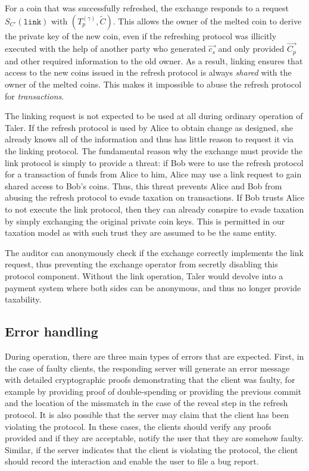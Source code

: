 \documentclass{llncs}
\begin{document}
For a coin that was successfully refreshed, the exchange responds to a
request $S_{C'}(\mathtt{link})$ with $(T^{(\gamma)}_p, \widetilde{C})$.
%
This allows the owner of the melted coin to derive the private key of
the new coin, even if the refreshing protocol was illicitly executed
with the help of another party who generated $\vec{c_s}$ and only
provided $\vec{C_p}$ and other required information to the old owner.
As a result, linking ensures that access to the new coins issued in
the refresh protocol is always {\em shared} with the owner of the
melted coins.  This makes it impossible to abuse the refresh protocol
for {\em transactions}.

The linking request is not expected to be used at all during ordinary
operation of Taler.  If the refresh protocol is used by Alice to
obtain change as designed, she already knows all of the information
and thus has little reason to request it via the linking protocol.
The fundamental reason why the exchange must provide the link protocol
is simply to provide a threat: if Bob were to use the refresh protocol
for a transaction of funds from Alice to him, Alice may use a link
request to gain shared access to Bob's coins. Thus, this threat
prevents Alice and Bob from abusing the refresh protocol to evade
taxation on transactions. If Bob trusts Alice to not execute the link
protocol, then they can already conspire to evade taxation by simply
exchanging the original private coin keys.  This is permitted in our
taxation model as with such trust they are assumed to be the same
entity.

The auditor can anonymously check if the exchange correctly implements the
link request, thus preventing the exchange operator from secretly disabling
this protocol component.  Without the link operation, Taler would
devolve into a payment system where both sides can be anonymous, and
thus no longer provide taxability.


\subsection{Error handling}

During operation, there are three main types of errors that are
expected.  First, in the case of faulty clients, the responding server
will generate an error message with detailed cryptographic proofs
demonstrating that the client was faulty, for example by providing
proof of double-spending or providing the previous commit and the
location of the missmatch in the case of the reveal step in the
refresh protocol.  It is also possible that the server may claim that
the client has been violating the protocol.  In these cases, the
clients should verify any proofs provided and if they are acceptable,
notify the user that they are somehow faulty.  Similar, if the
server indicates that the client is violating the protocol, the
client should record the interaction and enable the user to file a
bug report.
\end{document}
